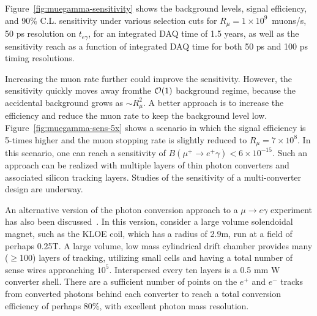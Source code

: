 Figure~\ref{fig:muegamma-sensitivity} shows the background levels, 
signal efficiency, and 90\%
C.L. sensitivity under various selection cuts for 
$R_\mu=1\times 10^{9}$~muons/s, 50 ps resolution on $t_{e\gamma}$, for
an integrated DAQ time of 1.5 years, as well as the sensitivity reach
as a function of integrated DAQ time for both 50 ps and 100 ps timing
resolutions. 

Increasing the muon rate further could improve the sensitivity. However,
the sensitivity quickly moves away fromthe  ${\cal O}(1)$ background regime, because the accidental
background grows as $\sim R_\mu^2$. A better approach is to increase the
efficiency and reduce the muon rate to keep the background level low. 
Figure~\ref{fig:muegamma-sens-5x} 
shows a scenario in which the signal efficiency is 5-times higher
and the muon stopping rate is slightly reduced to $R_\mu=7\times 10^{8}$. 
In this scenario, one can reach a sensitivity of $B(\mu^+\to e^+\gamma)<6\times 10^{-15}$.
Such an approach can be realized with multiple layers of thin photon converters and associated silicon tracking layers. Studies of the sensitivity of a multi-converter design are underway.

An alternative version of the photon conversion approach to a $\mu \to e \gamma$ 
experiment has also been discussed~\cite{franco}. In this version, consider a large volume
solendoidal magnet, such as the KLOE coil, which has a radius of 2.9m, run at a
field of perhaps 0.25T. A large volume, low mass cylindrical drift chamber 
provides many ($\ge$100) layers of tracking, utilizing small cells and having 
a total number of sense wires approaching $10^5$. Interspersed every ten layers 
is a 0.5 mm W converter shell. There are a sufficient number of points on the 
$e^+$ and $e^-$ tracks from converted photons behind each converter to reach a
 total conversion efficiency of perhaps 80\%, with excellent photon mass 
resolution. 



